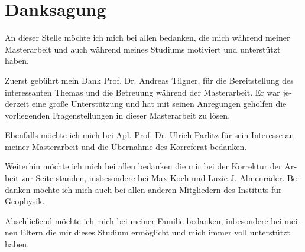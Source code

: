  \chapter*{Danksagung}

\begin{otherlanguage}{ngerman}
  \thispagestyle{empty}


An dieser Stelle möchte ich mich bei allen bedanken, die mich während meiner Masterarbeit
und auch während meines Studiums motiviert und unterstützt haben.

\bigbreak

Zuerst gebührt mein Dank  Prof. Dr. Andreas Tilgner,
für die Bereitstellung des interessanten Themas und die Betreuung während der Masterarbeit.
Er war jederzeit eine große Unterstützung und hat mit seinen Anregungen geholfen
die vorliegenden Fragenstellungen in dieser Masterarbeit zu lösen.

\bigbreak
Ebenfalls möchte ich mich bei Apl. Prof. Dr. Ulrich Parlitz für sein Interesse an meiner Masterarbeit
und die Übernahme des Korreferat bedanken.

\bigbreak

Weiterhin möchte ich mich bei allen bedanken die mir bei der Korrektur der Arbeit zur Seite standen,
insbesondere bei Max Koch und Luzie J. Almenräder.
Bedanken möchte ich mich auch bei allen anderen Mitgliedern des Instituts für Geophysik.

\bigbreak

Abschließend möchte ich mich bei meiner Familie bedanken,
inbesondere bei meinen Eltern  die mir dieses Studium ermöglicht und
mich immer voll unterstützt haben.

  \null\vfill
  \noindent
\end{otherlanguage}
